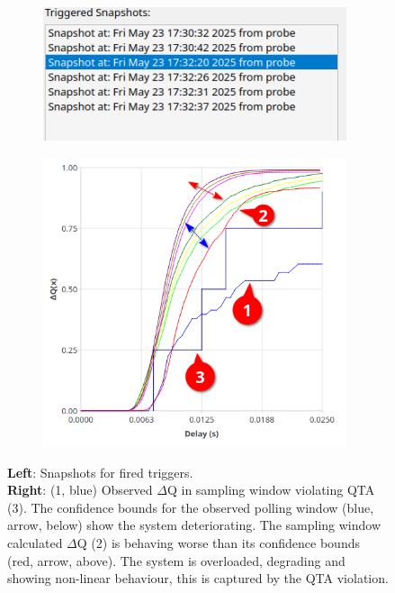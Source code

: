         \begin{figure}[H]
            \centering
            \begin{subfigure}{.5\textwidth}
                \centering
                \includegraphics[width=0.98\textwidth]{img/violated.png}
                \label{fig:high_load_1}
            \end{subfigure}%
            \begin{subfigure}{.5\textwidth}
                \centering
                \includegraphics[width =0.98\textwidth]{img/overload_2/qta_triggerd2.png}
                \label{fig:high_load_2}
            \end{subfigure}
            \caption{\textbf{Left}: Snapshots for fired triggers. \\
            \textbf{Right}: (1, blue) Observed $\Delta$Q in sampling window violating QTA (3). The confidence bounds for the observed polling window (blue, arrow, below) show the system deteriorating. The sampling window calculated $\Delta$Q (2) is behaving worse than its confidence bounds (red, arrow, above). The system is overloaded, degrading and showing non-linear behaviour, this is captured by the QTA violation.} %
            \label{fig:qta_viol_1}
        \end{figure}
